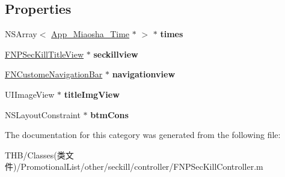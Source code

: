 \subsection*{Properties}
\begin{DoxyCompactItemize}
\item 
\mbox{\label{category_f_n_p_sec_kill_controller_07_08_a51360fdfe06fd24588cc2c0d3e96cce0}} 
N\+S\+Array$<$ \mbox{\hyperlink{interface_app___miaosha___time}{App\+\_\+\+Miaosha\+\_\+\+Time}} $\ast$ $>$ $\ast$ {\bfseries times}
\item 
\mbox{\label{category_f_n_p_sec_kill_controller_07_08_ac65a28ec44013c352a2891dbf2714b4f}} 
\mbox{\hyperlink{interface_f_n_p_sec_kill_title_view}{F\+N\+P\+Sec\+Kill\+Title\+View}} $\ast$ {\bfseries seckillview}
\item 
\mbox{\label{category_f_n_p_sec_kill_controller_07_08_a9021c8f1621a653a2f53b3f8b71fa135}} 
\mbox{\hyperlink{interface_f_n_custome_navigation_bar}{F\+N\+Custome\+Navigation\+Bar}} $\ast$ {\bfseries navigationview}
\item 
\mbox{\label{category_f_n_p_sec_kill_controller_07_08_a44b1753da856e2cef1f8fbbf4210c47b}} 
U\+I\+Image\+View $\ast$ {\bfseries title\+Img\+View}
\item 
\mbox{\label{category_f_n_p_sec_kill_controller_07_08_a2a4d3c9dcd608024ac61e7c0434dd2c4}} 
N\+S\+Layout\+Constraint $\ast$ {\bfseries btm\+Cons}
\end{DoxyCompactItemize}


The documentation for this category was generated from the following file\+:\begin{DoxyCompactItemize}
\item 
T\+H\+B/\+Classes(类文件)/\+Promotional\+List/other/seckill/controller/F\+N\+P\+Sec\+Kill\+Controller.\+m\end{DoxyCompactItemize}
